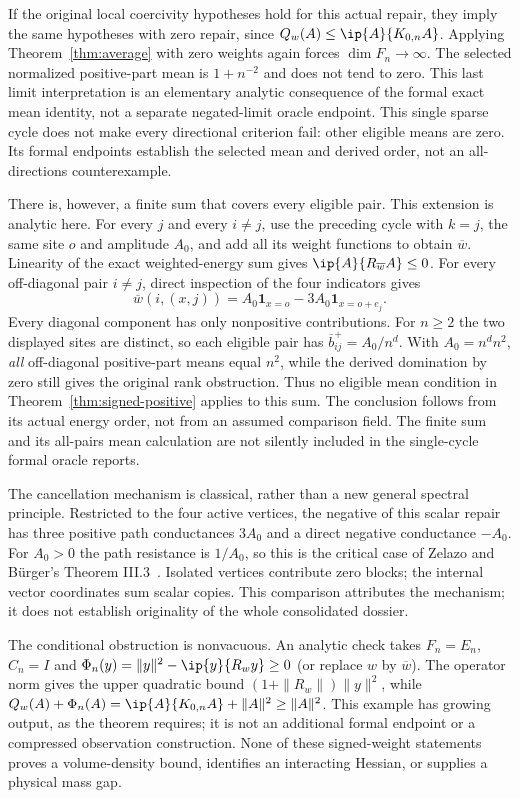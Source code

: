 If the original local coercivity hypotheses hold for this actual repair,
they imply the same hypotheses with zero repair, since $Q_w(A)\leq
\ip{A}{K_{0,n}A}$. Applying Theorem~\ref{thm:average} with zero weights
again forces $\dim F_n\to\infty$. The selected normalized positive-part mean is
$1+n^{-2}$ and does not tend to zero. This last limit interpretation is
an elementary analytic consequence of the formal exact mean identity,
not a separate negated-limit oracle endpoint. This single sparse cycle
does not make every directional criterion fail: other eligible means
are zero. Its formal endpoints establish the selected mean and derived
order, not an all-directions counterexample.

There is, however, a finite sum that covers every eligible pair. This
extension is analytic here. For every $j$ and every $i\ne j$, use the
preceding cycle with $k=j$, the same site $o$ and amplitude $A_0$, and add
all its weight functions to obtain $\overline w$. Linearity of the exact
weighted-energy sum gives $\ip{A}{R_{\overline w}A}\leq0$.
For every off-diagonal pair $i\ne j$, direct inspection of the four
indicators gives
\[
 \overline w(i,(x,j))=
 A_0\mathbf1_{x=o}-3A_0\mathbf1_{x=o+e_j}.
\]
Every diagonal component has only nonpositive contributions. For $n\geq2$
the two displayed sites are distinct, so each eligible pair has
$\overline b^+_{ij}=A_0/n^d$. With $A_0=n^d n^2$, \emph{all} off-diagonal
positive-part means equal $n^2$, while the derived domination by zero
still gives the original rank obstruction. Thus no eligible mean condition
in Theorem~\ref{thm:signed-positive} applies to this sum. The conclusion
follows from its actual energy order, not from an assumed comparison
field. The finite sum and its all-pairs mean calculation are not silently
included in the single-cycle formal oracle reports.

The cancellation mechanism is classical, rather than a new general
spectral principle. Restricted to the four active vertices, the negative
of this scalar repair has three positive path conductances $3A_0$ and a
direct negative conductance $-A_0$. For $A_0>0$ the path resistance is
$1/A_0$, so this is the critical case of Zelazo and B\"urger's
Theorem III.3~\cite{zelazo}. Isolated vertices contribute zero blocks;
the internal vector coordinates sum scalar copies. This comparison
attributes the mechanism; it does not establish originality of the
whole consolidated dossier.

The conditional obstruction is nonvacuous. An analytic check takes
$F_n=E_n$, $C_n=I$ and
$\Phi_n(y)=\|y\|^2-\ip{y}{R_w y}\geq0$ (or replace $w$ by $\overline w$).
The operator norm gives the upper quadratic bound
$(1+\|R_w\|)\|y\|^2$, while $Q_w(A)+\Phi_n(A)
=\ip{A}{K_{0,n}A}+\|A\|^2\geq\|A\|^2$.
This example has growing output, as the theorem requires; it is not an
additional formal endpoint or a compressed observation construction.
None of these signed-weight statements proves a volume-density bound,
identifies an interacting Hessian, or supplies a physical mass gap.
